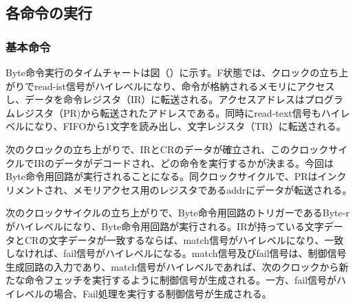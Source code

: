 \documentclass[paper]{ieicej}
\begin{document}

\subsection{各命令の実行}

\subsubsection{基本命令}

Byte命令実行のタイムチャートは図（）に示す。F状態では、クロックの立ち上がりでread-ist信号がハイレベルになり、命令が格納されるメモリにアクセスし、データを命令レジスタ（IR）に転送される。アクセスアドレスはプログラムレジスタ（PR)から転送されたアドレスである。同時にread-text信号もハイレベルになり、FIFOから1文字を読み出し、文字レジスタ（TR）に転送される。

次のクロックの立ち上がりで、IRとCRのデータが確立され、このクロックサイクルでIRのデータがデコードされ、どの命令を実行するかが決まる。今回はByte命令用回路が実行されることになる。同クロックサイクルで、PRはインクリメントされ、メモリアクセス用のレジスタであるaddrにデータが転送される。

次のクロックサイクルの立ち上がりで、Byte命令用回路のトリガーであるByte-rがハイレベルになり、Byte命令用回路が実行される。IRが持っている文字データとCRの文字データが一致するならば、match信号がハイレベルになり、一致しなければ、fail信号がハイレベルになる。match信号及びfail信号は、制御信号生成回路の入力であり、match信号がハイレベルであれば、次のクロックから新たな命令フェッチを実行するように制御信号が生成される。一方、fail信号がハイレベルの場合、Fail処理を実行する制御信号が生成される。
\end{document}
